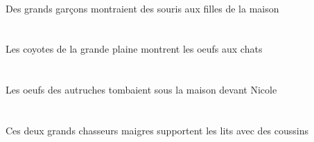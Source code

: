 \begin{exe}
   \INDPlErgG{}   \grandDPlG{}   \garconDPlErgG{}    \DEFPlOblG{}    \DEFSgOblG{}   \maisonDSgOblG{}   \DEG{}   \filleCPlOblG{}   \AG{}   \INDPlAbsG{}   \sourisBPlAbsG{}  \montrerVdPstBPlG{} \\
 Des grands garçons montraient des souris aux filles de la maison
\ex\glll
   \DEFPlErg{}    \DEFSgObl{}   \grandASg{}   \plaineASgObl{}   \DE{}   \coyoteCPlErg{}    \DEFPlObl{}   \chatDPlObl{}   \A{}   \DEFPlAbs{}   \oeufCPlAbs{}  \montrerVdPrsCPl{} \\
   \DEFPlErgP{}    \DEFSgOblP{}   \grandASgP{}   \plaineASgOblP{}   \DEP{}   \coyoteCPlErgP{}    \DEFPlOblP{}   \chatDPlOblP{}   \AP{}   \DEFPlAbsP{}   \oeufCPlAbsP{}  \montrerVdPrsCPlP{} \\
   \DEFPlErgG{}    \DEFSgOblG{}   \grandASgG{}   \plaineASgOblG{}   \DEG{}   \coyoteCPlErgG{}    \DEFPlOblG{}   \chatDPlOblG{}   \AG{}   \DEFPlAbsG{}   \oeufCPlAbsG{}  \montrerVdPrsCPlG{} \\
 Les coyotes de la grande plaine montrent les oeufs aux chats
\ex\glll
    \INDSgObl{}   \NicoleBSgObl{}   \DEVANT{}   \DEFPlAbs{}    \DEFPlObl{}   \autrucheBPlObl{}   \DE{}   \oeufCPlAbs{}    \DEFSgObl{}   \maisonDSgObl{}   \SOUS{}  \tomberViPstCPl{} \\
    \INDSgOblP{}   \NicoleBSgOblP{}   \DEVANTP{}   \DEFPlAbsP{}    \DEFPlOblP{}   \autrucheBPlOblP{}   \DEP{}   \oeufCPlAbsP{}    \DEFSgOblP{}   \maisonDSgOblP{}   \SOUSP{}  \tomberViPstCPlP{} \\
    \INDSgOblG{}   \NicoleBSgOblG{}   \DEVANTG{}   \DEFPlAbsG{}    \DEFPlOblG{}   \autrucheBPlOblG{}   \DEG{}   \oeufCPlAbsG{}    \DEFSgOblG{}   \maisonDSgOblG{}   \SOUSG{}  \tomberViPstCPlG{} \\
 Les oeufs des autruches tombaient sous la maison devant Nicole
\ex\glll
   \DEMDuErg{}   \grandCDu{}   \maigreCDu{}   \chasseurCDuErg{}    \INDPlObl{}   \coussinBPlObl{}   \AVEC{}   \DEFPlAbs{}   \litDPlAbs{}  \supporterVtPrsDPl{} \\
   \DEMDuErgP{}   \grandCDuP{}   \maigreCDuP{}   \chasseurCDuErgP{}    \INDPlOblP{}   \coussinBPlOblP{}   \AVECP{}   \DEFPlAbsP{}   \litDPlAbsP{}  \supporterVtPrsDPlP{} \\
   \DEMDuErgG{}   \grandCDuG{}   \maigreCDuG{}   \chasseurCDuErgG{}    \INDPlOblG{}   \coussinBPlOblG{}   \AVECG{}   \DEFPlAbsG{}   \litDPlAbsG{}  \supporterVtPrsDPlG{} \\
 Ces deux grands chasseurs maigres supportent les lits avec des coussins
\ex\glll
    \DEFSgObl{}   \cuisineDSgObl{}   \DANS{}   \DEFSgErg{}    \DEFSgObl{}   \chasseurCSgObl{}   \DE{}   \filleCSgErg{}    \DEFPlObl{}    \DEFSgObl{}   \plaineASgObl{}   \DE{}   \infirmiereAPlObl{}   \A{}   \INDDuAbs{}   \autrucheBDuAbs{}  \donnerVdPrsBDu{} \\

\end{exe}
